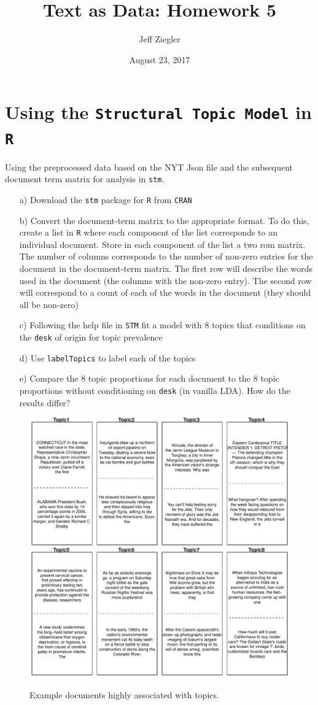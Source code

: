 \documentclass[12pt,letterpaper]{article}
\title{Text as Data: Homework 5}
\date{August 23, 2017}
\author{Jeff Ziegler}
\begin{document}
\maketitle


\section{Using the {\tt Structural Topic Model} in {\tt R}}
Using the preprocessed data based on the NYT Json file and the subsequent document term matrix for analysis in {\tt stm}.

\begin{itemize}
\item[a)] Download the {\tt stm} package for {\tt R} from {\tt CRAN}
\item[b)] Convert the document-term matrix to the appropriate format.  To do this, create a list in {\tt R} where each component of the list corresponds to an individual document.  Store in each component of the list a two rom matrix.  The number of columns corresponds to the number of non-zero entries for the document in the document-term matrix.  The first row will describe the words used in the document (the columns with the non-zero entry).  The second row will correspond to a count of each of the words in the document (they should all be non-zero)
\item[c)] Following the help file in {\tt STM} fit a model with 8 topics that conditions on the {\tt desk} of origin for topic prevalence
\item[d)] Use {\tt labelTopics} to label each of the topics
\item[e)] Compare the 8 topic proportions for each document to the 8 topic proportions without conditioning on {\tt desk} (in vanilla LDA).  How do the results differ?
\end{itemize}

  

\begin{figure}[H]
  \caption{\footnotesize{Example documents highly associated with topics.}}
  \centering
   \includegraphics[width=.75\linewidth]{HW5topicReview.pdf}\\
\end{figure}
\end{document}
